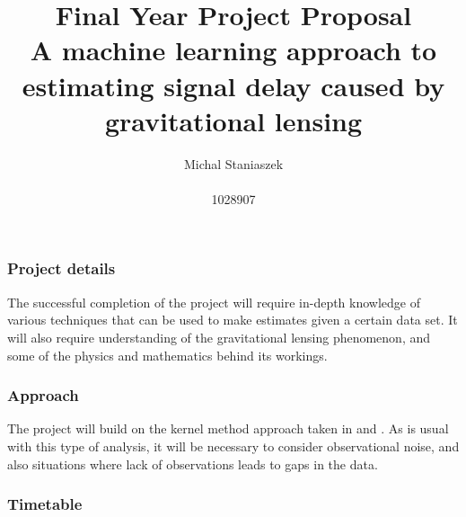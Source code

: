 \documentclass{article}
\title{Final Year Project Proposal\\ \vspace{0.2cm} \large{A machine learning approach to estimating signal delay caused by gravitational lensing}}
\author{Michal Staniaszek \\\\ 1028907}
\begin{document}
\maketitle

\subsubsection*{Project details}

The successful completion of the project will require in-depth knowledge of various techniques that can be used to make estimates given a certain data set. It will also require understanding of the gravitational lensing phenomenon, and some of the physics and mathematics behind its workings.

\subsubsection*{Approach}

The project will build on the kernel method approach taken in \cite{t09} and \cite{t06}. As is usual with this type of analysis, it will be necessary to consider observational noise, and also situations where lack of observations leads to gaps in the data. 

\subsubsection*{Timetable}

\begin{gantt}{15}{9}
  \begin{ganttitle}
  \end{ganttitle}
  \begin{ganttitle}
  \end{ganttitle}
\end{gantt}
\end{document}
